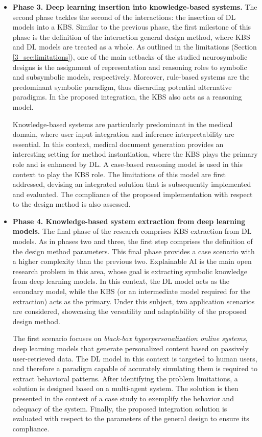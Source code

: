 \begin{itemize}
    \item \textbf{Phase 3. Deep learning insertion into knowledge-based systems.} The second phase tackles the second of the interactions: the insertion of DL models into a KBS. Similar to the previous phase, the first milestone of this phase is the definition of the interaction general design method, where KBS and DL models are treated as a whole. As outlined in the limitations (Section \ref{3_sec:limitations}), one of the main setbacks of the studied neurosymbolic designs is the assignment of representation and reasoning roles to symbolic and subsymbolic models, respectively. Moreover, rule-based systems are the predominant symbolic paradigm, thus discarding potential alternative paradigms. In the proposed integration, the KBS also acts as a reasoning model. 
    
    Knowledge-based systems are particularly predominant in the medical domain, where user input integration and inference interpretability are essential. In this context, medical document generation provides an interesting setting for method instantiation, where the KBS plays the primary role and is enhanced by DL.  A case-based reasoning model is used in this context to play the KBS role. The limitations of this model are first addressed, devising an integrated solution that is subsequently implemented and evaluated. The compliance of the proposed implementation with respect to the design method is also assessed. 
    
    \item \textbf{Phase 4. Knowledge-based system extraction from deep learning models.} The final phase of the research comprises KBS extraction from DL models. As in phases two and three, the first step comprises the definition of the design method parameters. This final phase provides a case scenario with a higher complexity than the previous two. Explainable AI is the main open research problem in this area, whose goal is extracting symbolic knowledge from deep learning models. In this context, the DL model acts as the secondary model, while the KBS (or an intermediate model required for the extraction) acts as the primary. Under this subject, two application scenarios are considered, showcasing the versatility and adaptability of the proposed design method. 
    
    The first scenario focuses on \textit{black-box hyperpersonalization online systems}, deep learning models that generate personalized content based on passively user-retrieved data. The DL model in this context is targeted to human users, and therefore a paradigm capable of accurately simulating them is required to extract behavioral patterns. After identifying the problem limitations, a solution is designed based on a multi-agent system. The solution is then presented in the context of a case study to exemplify the behavior and adequacy of the system. Finally, the proposed integration solution is evaluated with respect to the parameters of the general design to ensure its compliance.
    

\end{itemize}
